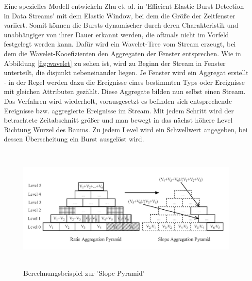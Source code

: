 Eine spezielles Modell entwickeln Zhu et. al. in 'Efficient Elastic Burst Detection in Data Streams' \cite{Zhu:2003:EEB:956750.956789} mit dem Elastic Window, bei dem   die Größe der Zeitfenster variiert. Somit können die Bursts dynamischer durch deren Charakteristik und unabhängiger von ihrer Dauer erkannt werden, die oftmals nicht im Vorfeld festgelegt werden kann. Dafür wird ein Wavelet-Tree vom Stream erzeugt, bei dem die Wavelet-Kooefizienten den Aggregaten der Fenster entsprechen. Wie in Abbildung \ref{fig:wavelet} zu sehen ist, wird zu Beginn der Stream in Fenster unterteilt, die disjunkt nebeneinander liegen. Je Fenster wird ein Aggregat erstellt - in der Regel werden dazu die Ereignisse eines bestimmten Typs oder Ereignisse mit gleichen Attributen gezählt. Diese Aggregate bilden nun selbst einen Stream. Das Verfahren wird wiederholt, vorausgesetzt es befinden sich entsprechende Ereignisse bzw. aggregierte Ereignisse im Stream. Mit jedem Schritt wird der betrachtete Zeitabschnitt größer und man bewegt in das nächst höhere Level Richtung Wurzel des Baums. Zu jedem Level wird ein Schwellwert angegeben, bei dessen Überscheitung ein Burst ausgelöst wird.\\

\begin{figure}[htbp]
\centerline{\includegraphics[height=6.3cm]{images/slopepyramid.jpg}}
\caption{Berechnungsbeispiel zur 'Slope Pyramid' \cite{yuan2007online}}
\label{fig:slopepyramid}
\end{figure}




